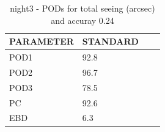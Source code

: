 \begin{table}[p!]
\begin{center}
\begin{tabular}{|l|l|l|l|}
\hline
\multicolumn{1}{|c|}{\cellcolor[HTML]{C0C0C0}\textbf{PARAMETER}} & \multicolumn{1}{c|}{\cellcolor[HTML]{C0C0C0}\textbf{STANDARD}}\\
\hline
\cellcolor[HTML]{C0C0C0}POD1  & 92.8                                \\
\cellcolor[HTML]{C0C0C0}POD2  & 96.7                                \\
\cellcolor[HTML]{C0C0C0}POD3  & 78.5                                \\
\cellcolor[HTML]{C0C0C0}PC    & 92.6                                  \\
\cellcolor[HTML]{C0C0C0}EBD   & 6.3                                 \\
\hline
\end{tabular}
\caption{night3 - PODs for total seeing (arcsec) and accuray 0.24}
\label{tab:podsee0.24:night3}
\end{center}
\end{table}
